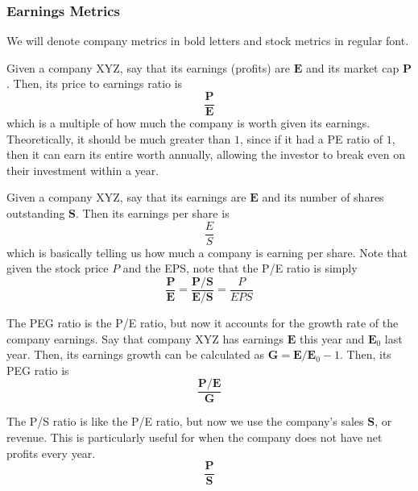 \documentclass{article}
\begin{document}
  \subsubsection{Earnings Metrics}

  We will denote company metrics in bold letters and stock metrics in regular font. 

  \begin{definition}[P/E Ratio]
  Given a company XYZ, say that its earnings (profits) are $\mathbf{E}$ and its market cap $\mathbf{P}$. Then, its price to earnings ratio is 
  \[\frac{\mathbf{P}}{\mathbf{E}}\]
  which is a multiple of how much the company is worth given its earnings. Theoretically, it should be much greater than $1$, since if it had a PE ratio of $1$, then it can earn its entire worth annually, allowing the investor to break even on their investment within a year. 
  \end{definition}

  \begin{definition}
  Given a company XYZ, say that its earnings are $\mathbf{E}$ and its number of shares outstanding $\mathbf{S}$. Then its earnings per share is 
  \[\frac{E}{S}\]
  which is basically telling us how much a company is earning per share. Note that given the stock price $P$ and the EPS, note that the P/E ratio is simply 
  \[\frac{\mathbf{P}}{\mathbf{E}} = \frac{\mathbf{P} / \mathbf{S}}{\mathbf{E} / \mathbf{S}} = \frac{P}{EPS}\]
  \end{definition}

  \begin{definition}
  The PEG ratio is the P/E ratio, but now it accounts for the growth rate of the company earnings. Say that company XYZ has earnings $\mathbf{E}$ this year and $\mathbf{E}_0$ last year. Then, its earnings growth can be calculated as $\mathbf{G} = \mathbf{E}/\mathbf{E}_0 - 1$. Then, its PEG ratio is 
  \[\frac{\mathbf{P}/\mathbf{E}}{\mathbf{G}}\]
  \end{definition}

  \begin{definition}[P/S Ratio]
  The P/S ratio is like the P/E ratio, but now we use the company's sales $\mathbf{S}$, or revenue. This is particularly useful for when the company does not have net profits every year. 
  \[\frac{\mathbf{P}}{\mathbf{S}}\]
  \end{definition}

  \begin{definition}[ROIC]

  \end{definition}
\end{document}
